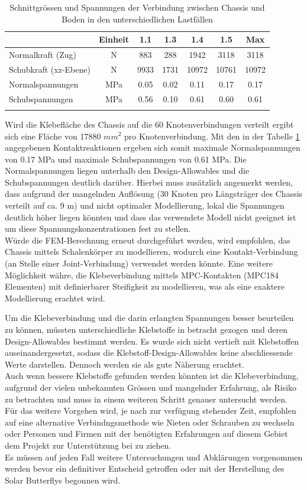 \begin{table}[H]
\centering
\begin{tabular}{lcccccc}
\thickhline
	&	Einheit	&	1.1	&	1.3	&	1.4	&	1.5	&	Max	\\	\hline
Normalkraft (Zug)	&	N	&	883	&	288	&	1942	&	3118	&	3118	\\
Schubkraft (xz-Ebene)	&	N	&	9933	&	1731	&	10972	&	10761	&	10972	\\	\hline
Normalspannungen	&	MPa	&	0.05	&	0.02	&	0.11	&	0.17	&	0.17	\\
Schubspannungen	&	MPa	&	0.56	&	0.10	&	0.61	&	0.60	&	0.61	\\	\thickhline
\end{tabular}
\caption{Schnittgrössen und Spannungen der Verbindung zwischen Chassis und Boden in den unterschiedlichen Lastfällen}
\label{tab:FEMres Boden}
\end{table}


Wird die Klebefläche des Chassis auf die 60 Knotenverbindungen verteilt ergibt sich eine Fläche von 17880 $mm^2$ pro Knotenverbindung. Mit den in der Tabelle \ref{tab:FEMres Boden} angegebenen Kontaktreaktionen ergeben sich somit maximale Normalspannungen von 0.17 MPa und maximale Schubspannungen von 0.61 MPa. Die Normalspannungen liegen unterhalb den Design-Allowables und die Schubspannungen deutlich darüber. Hierbei muss zusätzlich angemerkt werden, dass aufgrund der mangelnden Auflösung (30 Knoten pro Längsträger des Chassis verteilt auf ca. 9 m) und nicht optimaler Modellierung, lokal die Spannungen deutlich höher liegen könnten und dass das verwendete Modell nicht geeignet ist um diese Spannungskonzentrationen fest zu stellen.\\
Würde die FEM-Berechnung erneut durchgeführt werden, wird empfohlen, das Chassis mittels Schalenkörper zu modellieren, wodurch eine Kontakt-Verbindung (an Stelle einer Joint-Verbindung) verwendet werden könnte. Eine weitere Möglichkeit währe, die Klebeverbindung mittels MPC-Kontakten (MPC184 Elementen) mit definierbarer Steifigkeit zu modellieren, was als eine exaktere Modellierung erachtet wird.

Um die Klebeverbindung und die darin erlangten Spannungen besser beurteilen zu können, müssten unterschiedliche Klebstoffe in betracht gezogen und deren Design-Allowables bestimmt werden. Es wurde sich nicht vertieft mit Klebstoffen auseinandergesetzt, sodass die Klebstoff-Design-Allowables keine abschliessende Werte darstellen. Dennoch werden sie als gute Näherung erachtet.\\
Auch wenn bessere Klebstoffe gefunden werden könnten ist die Klebeverbindung, aufgrund der vielen unbekannten Grössen und mangelnder Erfahrung, als Risiko zu betrachten und muss in einem weiteren Schritt genauer untersucht werden. Für das weitere Vorgehen wird, je nach zur verfügung stehender Zeit, empfohlen auf eine alternative Verbindngsmethode wie Nieten oder Schrauben zu wechseln oder Personen und Firmen mit der benötigten Erfahrungen auf diesem Gebiet dem Projekt zur Unterstützung bei zu ziehen.\\
Es müssen auf jeden Fall weitere Untersuchungen und Abklärungen vorgenommen werden bevor ein definitiver Entscheid getroffen oder mit der Herstellung des Solar Butterflys begonnen wird.

